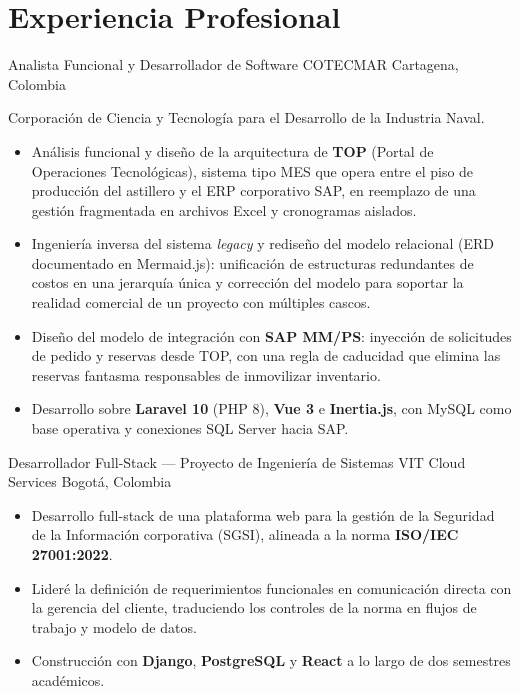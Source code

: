 \section{Experiencia Profesional}

        {Analista Funcional y Desarrollador de Software}
        {COTECMAR}
        {Cartagena, Colombia}{}
{Corporación de Ciencia y Tecnología para el Desarrollo de la Industria Naval.
\begin{itemize}
  \item Análisis funcional y diseño de la arquitectura de \textbf{TOP} (Portal de
        Operaciones Tecnológicas), sistema tipo MES que opera entre el piso de
        producción del astillero y el ERP corporativo SAP, en reemplazo de una
        gestión fragmentada en archivos Excel y cronogramas aislados.
  \item Ingeniería inversa del sistema \emph{legacy} y rediseño del modelo relacional
        (ERD documentado en Mermaid.js): unificación de estructuras redundantes de
        costos en una jerarquía única y corrección del modelo para soportar la
        realidad comercial de un proyecto con múltiples cascos.
  \item Diseño del modelo de integración con \textbf{SAP MM/PS}: inyección de
        solicitudes de pedido y reservas desde TOP, con una regla de caducidad que
        elimina las reservas fantasma responsables de inmovilizar inventario.
  \item Desarrollo sobre \textbf{Laravel 10} (PHP 8), \textbf{Vue 3} e
        \textbf{Inertia.js}, con MySQL como base operativa y conexiones SQL Server
        hacia SAP.
\end{itemize}}

        {Desarrollador Full-Stack --- Proyecto de Ingeniería de Sistemas}
        {VIT Cloud Services}
        {Bogotá, Colombia}{}
{\begin{itemize}
  \item Desarrollo full-stack de una plataforma web para la gestión de la
        Seguridad de la Información corporativa (SGSI), alineada a la norma
        \textbf{ISO/IEC 27001:2022}.
  \item Lideré la definición de requerimientos funcionales en comunicación
        directa con la gerencia del cliente, traduciendo los controles de la
        norma en flujos de trabajo y modelo de datos.
  \item Construcción con \textbf{Django}, \textbf{PostgreSQL} y \textbf{React}
        a lo largo de dos semestres académicos.
\end{itemize}}

